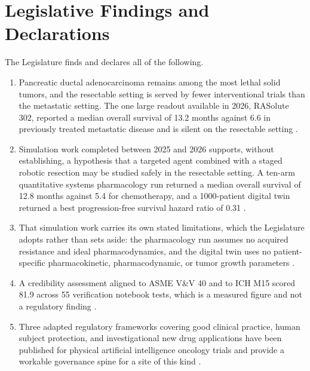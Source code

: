 
\section{Legislative Findings and Declarations}

The Legislature finds and declares all of the following.

\begin{enumerate}
\item Pancreatic ductal adenocarcinoma remains among the most lethal solid
  tumors, and the resectable setting is served by fewer interventional trials
  than the metastatic setting. The one large readout available in 2026,
  RASolute 302, reported a median overall survival of 13.2 months against 6.6 in
  previously treated metastatic disease and is silent on the resectable setting
  \cite{rasolute302}.

\item Simulation work completed between 2025 and 2026 supports, without
  establishing, a hypothesis that a targeted agent combined with a staged
  robotic resection may be studied safely in the resectable setting. A ten-arm
  quantitative systems pharmacology run returned a median overall survival of
  12.8 months against 5.4 for chemotherapy, and a 1000-patient digital twin
  returned a best progression-free survival hazard ratio of 0.31
  \cite{qspmetpancre,daraxsims}.

\item That simulation work carries its own stated limitations, which the
  Legislature adopts rather than sets aside: the pharmacology run assumes no
  acquired resistance and ideal pharmacodynamics, and the digital twin uses no
  patient-specific pharmacokinetic, pharmacodynamic, or tumor growth parameters
  \cite{qspmetpancre,daraxsims}.

\item A credibility assessment aligned to ASME V\&V 40 and to ICH M15 scored
  81.9 across 55 verification notebook tests, which is a measured figure and not
  a regulatory finding \cite{daraxsims,asmevv40,ichm15}.

\item Three adapted regulatory frameworks covering good clinical practice, human
  subject protection, and investigational new drug applications have been
  published for physical artificial intelligence oncology trials and provide a
  workable governance spine for a site of this kind
  \cite{iche6r3adapt,cfr50adapt,cfr312adapt}.


\end{enumerate}
